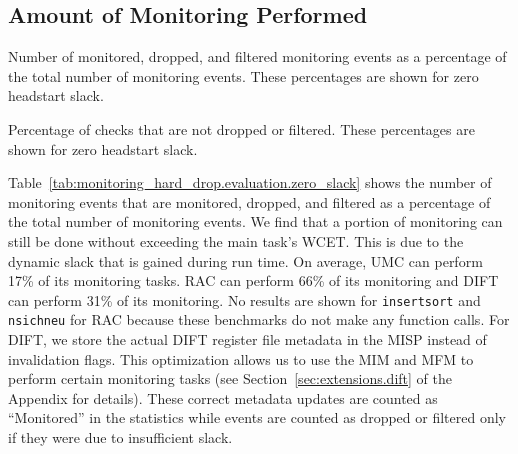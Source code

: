 \subsection{Amount of Monitoring Performed}
\label{sec:monitoring_hard_drop.evaluation.coverage}

\begin{table}[tb]
  \begin{center}
    \caption{Number of monitored, dropped, and filtered monitoring events as a
    percentage of the total number of monitoring events. These percentages are
    shown for zero headstart slack.}
    \begin{footnotesize}
    
    \end{footnotesize}
    \label{tab:monitoring_hard_drop.evaluation.zero_slack}
  \end{center}
\end{table}

\begin{table}[tb]
  \begin{center}
    \caption{Percentage of checks that are not dropped or filtered. These percentages are shown for zero headstart slack.}
    \label{tab:monitoring_hard_drop.evaluation.zero_slack_coverage}
    \begin{footnotesize}
    
    \end{footnotesize}
  \end{center}
\end{table}

Table~\ref{tab:monitoring_hard_drop.evaluation.zero_slack} shows the number of
monitoring events that are monitored, dropped, and filtered as a percentage of
the total number of monitoring events. We find that a portion of monitoring can
still be done without exceeding the main task's WCET. This is due to the
dynamic slack that is gained during run time. On average, UMC can perform 17\%
of its monitoring tasks. RAC can perform 66\% of its monitoring and DIFT can
perform 31\% of its monitoring.  No results are shown for {\tt insertsort} and
{\tt nsichneu} for RAC because these benchmarks do not make any function calls.
For DIFT, we store the actual DIFT register file metadata in the MISP instead
of invalidation flags. This optimization allows us to use the MIM and MFM to
perform certain monitoring tasks (see Section~\ref{sec:extensions.dift} of the
Appendix for details). These correct metadata updates are counted as
``Monitored'' in the statistics while events are counted as dropped or filtered
only if they were due to insufficient slack.

